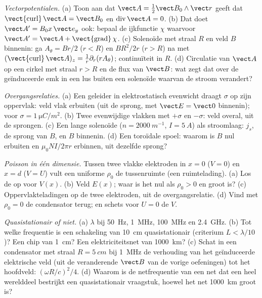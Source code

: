 \begin{exercise}[$\star\star$]\label{exo:b2:maxwell-equations:5}
\emph{Vectorpotentialen.} (a) Toon aan dat
$\vect A = \tfrac12\vect B_0\wedge\vect r$ geeft dat
$\operatorname{\vect{curl}}\vect A = \vect B_0$ en
$\operatorname{div}\vect A = 0$. (b) Dat doet $\vect A' = B_0x\,\vect e_y$
ook: bepaal de ijkfunctie $\chi$ waarvoor
$\vect A' = \vect A + \operatorname{\vect{grad}}\chi$. (c) Solenoïde met
straal $R$ en veld $B$ binnenin: ga $A_\theta = Br/2$ ($r < R$) en $BR^2/2r$
($r > R$) na met
$(\operatorname{\vect{curl}}\vect A)_z = \frac1r\partial_r(rA_\theta)$;
continuïteit in $R$. (d) Circulatie van $\vect A$ op een cirkel met straal
$r > R$ en de flux van $\vect B$: wat zegt dat over de geïnduceerde emk in
een lus buiten een solenoïde waarvan de stroom verandert?
\end{exercise}

\begin{exercise}[$\star\star$]\label{exo:b2:maxwell-equations:6}
\emph{Overgangsrelaties.} (a) Een geleider in elektrostatisch evenwicht
draagt $\sigma$ op zijn oppervlak: veld vlak erbuiten (uit de sprong, met
$\vect E = \vect 0$ binnenin); voor $\sigma = \qty{1}{\micro C/m^2}$. (b)
Twee evenwijdige vlakken met $+\sigma$ en $-\sigma$: veld overal, uit de
sprongen. (c) Een lange solenoïde ($n = \qty{2000}{m^{-1}}$,
$I = \qty{5}{A}$) als stroomlaag: $j_s$, de sprong van $B$, en $B$ binnenin.
(d) Een toroïdale spoel: waarom is $B$ nul erbuiten en $\mu_0NI/2\pi r$
erbinnen, uit dezelfde sprong?
\end{exercise}

\begin{exercise}[$\star\star$]\label{exo:b2:maxwell-equations:7}
\emph{Poisson in één dimensie.} Tussen twee vlakke elektroden in $x = 0$
($V = 0$) en $x = d$ ($V = U$) vult een uniforme  $\rho_0$
de tussenruimte (een ruimtelading). (a) Los de  op
voor $V(x)$. (b) Veld $E(x)$; waar is het nul als $\rho_0 > 0$ en groot is?
(c) Oppervlakteladingen op de twee elektroden, uit de overgangsrelatie. (d)
Vind met $\rho_0 = 0$ de condensator terug; en schets voor $U = 0$ de $V$.
\end{exercise}

\begin{exercise}[$\star\star$]\label{exo:b2:maxwell-equations:8}
\emph{Quasistationair of niet.} (a) $\lambda$ bij \qty{50}{Hz},
\qty{1}{MHz}, \qty{100}{MHz} en \qty{2.4}{GHz}. (b) Tot welke frequentie is
een schakeling van \qty{10}{cm} quasistationair (criterium
$L < \lambda/10$)? Een chip van \qty{1}{cm}? Een elektriciteitsnet van
\qty{1000}{km}? (c) Schat in een condensator met straal $R = \qty{5}{cm}$
bij \qty{1}{MHz} de verhouding van het geïnduceerde elektrische veld (uit de
veranderende $\vect B$ van de vorige oefeningen) tot het hoofdveld:
$(\omega R/c)^2
/4$. (d) Waarom is de netfrequentie van een net dat een heel
werelddeel bestrijkt een quasistationair vraagstuk, hoewel het net
\qty{1000}{km} groot is?
\end{exercise}

